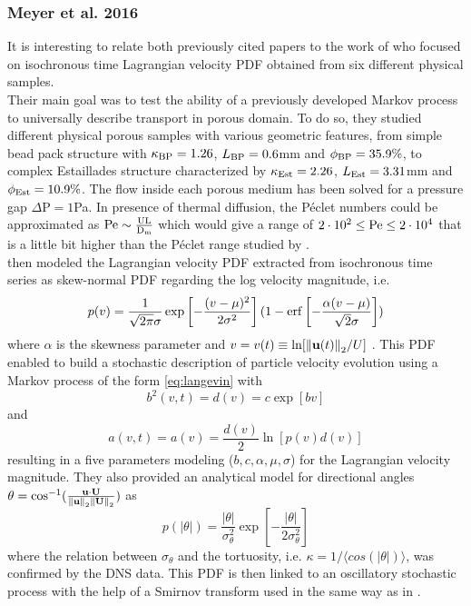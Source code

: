 \subsubsection{Meyer et al. 2016}
It is interesting to relate both previously cited papers to the work of \citet{Meyer2016} who focused on isochronous time Lagrangian velocity PDF obtained from six different physical samples. \\
Their main goal was to test the ability of a previously developed Markov process to universally describe transport in porous domain.
To do so, they studied different physical porous samples with various geometric features, from simple bead pack structure with $\kappa_{\rm{BP}} = 1.26$, $L_{\rm{BP}}=0.6$mm and $\phi_{\rm{BP}}=35.9\%$, to complex Estaillades structure characterized by $\kappa_{\rm{Est}} = 2.26$, $L_{\rm{Est}}=3.31$mm and $\phi_{\rm{Est}}=10.9\%$.
The flow inside each porous medium has been solved for a pressure gap $\Delta\textrm{P}=1$Pa. 
In presence of thermal diffusion, the Péclet numbers could be approximated as $\rm{Pe}\sim\frac{UL}{D_m}$ which would give a range of $2\cdot10^2\leq\rm{Pe}\leq2\cdot10^4$ that is a little bit higher than the Péclet range studied by \citet{Dentz2017}.\\
\citeauthor{Meyer2016} then modeled the Lagrangian velocity PDF extracted from isochronous time series as skew-normal PDF regarding the log velocity magnitude, i.e.
\begin{equation}\label{eq:meyer_skew}
p(v)=\frac{1}{\sqrt{2\pi}\sigma}\exp\left[-\frac{(v-\mu)^2}{2\sigma^2}\right](1-\erf\left[-\frac{\alpha(v-\mu)}{\sqrt{2}\sigma}\right])
\end{equation}
where $\alpha$ is the skewness parameter and $v=v(t)\equiv\ln[\norm{\textbf{u}(t)}_2/U]$ . This PDF enabled to build a stochastic description of particle velocity evolution using a Markov process of the form \eqref{eq:langevin} with 
\[b^2(v,t)=d(v)=c\exp[bv]\]
and 
\[a(v,t)=a(v)=\frac{d(v)}{2}\ln[p(v)d(v)]\]
resulting in a five parameters modeling ($b,c,\alpha,\mu,\sigma$) for the Lagrangian velocity magnitude.
They also provided an analytical model for directional angles $\theta=\cos^{-1}(\frac{\textbf{u}\cdot\textbf{U}}{\norm{\textbf{u}}_2\norm{\textbf{U}}_2})$ as
\[p(|\theta|)=\frac{|\theta|}{\sigma_\theta^2}\exp\left[-\frac{|\theta|}{2\sigma_\theta^2}\right]\]
where the relation between $\sigma_\theta$ and the tortuosity, i.e. $\kappa=1/\langle cos(|\theta|)\rangle$, was confirmed by the DNS data. This PDF is then linked to an oscillatory stochastic process with the help of a Smirnov transform used in the same way as in \citet{Puyguiraud2019}. \\
